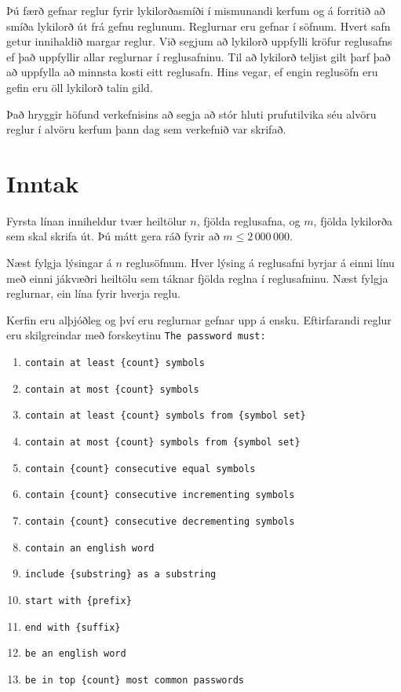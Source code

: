 Þú færð gefnar reglur fyrir lykilorðasmíði í mismunandi kerfum og á forritið að smíða lykilorð út frá gefnu reglunum.
Reglurnar eru gefnar í söfnum.
Hvert safn getur innihaldið margar reglur.
Við segjum að lykilorð uppfylli kröfur reglusafns ef það uppfyllir allar reglurnar í reglusafninu.
Til að lykilorð teljist gilt þarf það að uppfylla að minnsta kosti eitt reglusafn.
Hins vegar, ef engin reglusöfn eru gefin eru öll lykilorð talin gild.

Það hryggir höfund verkefnisins að segja að stór hluti prufutilvika séu alvöru reglur í alvöru kerfum þann dag sem verkefnið var skrifað.

\section*{Inntak}
Fyrsta línan inniheldur tvær heiltölur $n$, fjölda reglusafna, og $m$, fjölda lykilorða sem skal skrifa út.
Þú mátt gera ráð fyrir að $m \leq 2\,000\,000$.

Næst fylgja lýsingar á $n$ reglusöfnum.
Hver lýsing á reglusafni byrjar á einni línu með einni jákvæðri heiltölu sem táknar fjölda reglna í reglusafninu.
Næst fylgja reglurnar, ein lína fyrir hverja reglu.

Kerfin eru alþjóðleg og því eru reglurnar gefnar upp á ensku.
Eftirfarandi reglur eru skilgreindar með forskeytinu \texttt{The password must:}
\begin{enumerate}
    \item \texttt{contain at least \{count\} symbols}
    \item \texttt{contain at most \{count\} symbols}
    \item \texttt{contain at least \{count\} symbols from \{symbol set\}}
    \item \texttt{contain at most \{count\} symbols from \{symbol set\}}
    \item \texttt{contain \{count\} consecutive equal symbols}
    \item \texttt{contain \{count\} consecutive incrementing symbols}
    \item \texttt{contain \{count\} consecutive decrementing symbols}
    \item \texttt{contain an english word}
    \item \texttt{include \{substring\} as a substring}
    \item \texttt{start with \{prefix\}}
    \item \texttt{end with \{suffix\}}
    \item \texttt{be an english word}
    \item \texttt{be in top \{count\} most common passwords}
\end{enumerate}

